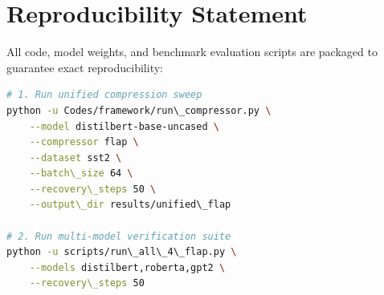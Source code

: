 \section{Reproducibility Statement}
All code, model weights, and benchmark evaluation scripts are packaged to guarantee exact reproducibility:
\begin{lstlisting}[language=bash]
# 1. Run unified compression sweep
python -u Codes/framework/run\_compressor.py \
    --model distilbert-base-uncased \
    --compressor flap \
    --dataset sst2 \
    --batch\_size 64 \
    --recovery\_steps 50 \
    --output\_dir results/unified\_flap

# 2. Run multi-model verification suite
python -u scripts/run\_all\_4\_flap.py \
    --models distilbert,roberta,gpt2 \
    --recovery\_steps 50
\end{lstlisting}
